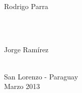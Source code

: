 \begin{titlepage}

\begin{minipage}{0.4\textwidth}
\begin{flushleft} \large
\emph{}\\
Rodrigo Parra %
\end{flushleft}
\end{minipage}
~
\begin{minipage}{0.4\textwidth}
\begin{flushright} \large
\emph{} \\
Jorge Ram\'{i}rez %
\end{flushright}
\end{minipage}\\[2.5cm]



{\large San Lorenzo - Paraguay}\\[0.3cm] %
{\large Marzo 2013}\\ %

 

\vfill %

\end{titlepage}